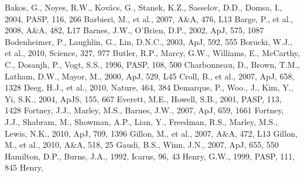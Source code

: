 \documentclass[12pt,preprint]{emulateapj}
\begin{document}

\begin{thebibliography}{}

 Bakos,
  G., Noyes, R.W., Kov\'acs, G., Stanek, K.Z., Sasselov, D.D., Domsa,
  I., 2004, PASP, 116, 266
  Barbieri, M., et al., 2007, A\&A, 476, L13
  Barge, P., et al., 2008, A\&A, 482, L17
  Barnes, J.W., O'Brien, D.P., 2002, ApJ, 575, 1087
  Bodenheimer, P., Laughlin, G., Lin, D.N.C., 2003, ApJ, 592, 555
  Borucki, W.J., et al., 2010, Science, 327, 977
 Butler,
  R.P., Marcy, G.W., Williams, E., McCarthy, C., Dosanjh, P., Vogt,
  S.S., 1996, PASP, 108, 500
  Charbonneau, D., Brown, T.M., Latham, D.W., Mayor, M., 2000, ApJ,
  529, L45
 Croll,
  B., et al., 2007, ApJ, 658, 1328
  Deeg, H.J., et al., 2010, Nature, 464, 384
  Demarque, P., Woo., J., Kim, Y., Yi, S.K., 2004, ApJS, 155, 667
  Everett, M.E., Howell, S.B., 2001, PASP, 113, 1428
  Fortney, J.J., Marley, M.S., Barnes, J.W., 2007, ApJ, 659, 1661
  Fortney, J.J., Shabram, M., Showman, A.P., Lian, Y., Freedman,
  R.S., Marley, M.S., Lewis, N.K., 2010, ApJ, 709, 1396
 Gillon,
  M., et al., 2007, A\&A, 472, L13
 Gillon,
  M., et al., 2010, A\&A, 518, 25
 Gaudi,
  B.S., Winn, J.N., 2007, ApJ, 655, 550
  Hamilton, D.P., Burns, J.A., 1992, Icarus, 96, 43
 Henry, G.W.,
  1999, PASP, 111, 845
 Henry,

\end{thebibliography}
\end{document}
